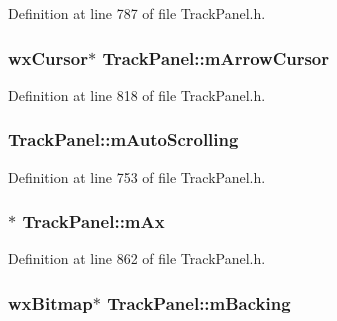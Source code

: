 Definition at line 787 of file Track\+Panel.\+h.

\subsubsection[{\texorpdfstring{m\+Arrow\+Cursor}{mArrowCursor}}]{\setlength{\rightskip}{0pt plus 5cm}wx\+Cursor$\ast$ Track\+Panel\+::m\+Arrow\+Cursor\hspace{0.3cm}{\ttfamily [protected]}}\hypertarget{class_track_panel_aeb8e3a8ba37bb6113d378e37dd90d910}{}\label{class_track_panel_aeb8e3a8ba37bb6113d378e37dd90d910}


Definition at line 818 of file Track\+Panel.\+h.

\subsubsection[{\texorpdfstring{m\+Auto\+Scrolling}{mAutoScrolling}}]{ Track\+Panel\+::m\+Auto\+Scrolling\hspace{0.3cm}{\ttfamily [protected]}}\hypertarget{class_track_panel_a284375ff1b505a777cd6dfad1b63040b}{}\label{class_track_panel_a284375ff1b505a777cd6dfad1b63040b}


Definition at line 753 of file Track\+Panel.\+h.

\subsubsection[{\texorpdfstring{m\+Ax}{mAx}}]{$\ast$ Track\+Panel\+::m\+Ax\hspace{0.3cm}{\ttfamily [protected]}}\hypertarget{class_track_panel_abc21f88241e49568ad393f60b8dd75b2}{}\label{class_track_panel_abc21f88241e49568ad393f60b8dd75b2}


Definition at line 862 of file Track\+Panel.\+h.

\subsubsection[{\texorpdfstring{m\+Backing}{mBacking}}]{\setlength{\rightskip}{0pt plus 5cm}wx\+Bitmap$\ast$ Track\+Panel\+::m\+Backing\hspace{0.3cm}{\ttfamily [protected]}}\hypertarget{class_track_panel_a8006fb5dcc7b4611aab348b0f03ef9d2}{}\label{class_track_panel_a8006fb5dcc7b4611aab348b0f03ef9d2}


